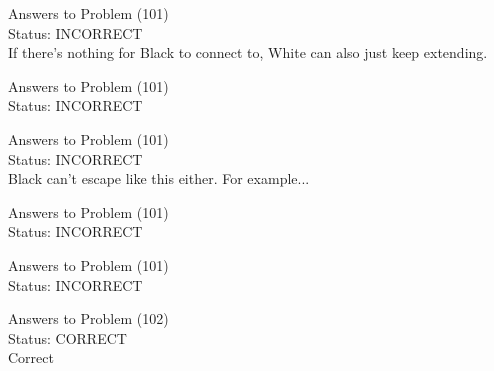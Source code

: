 \documentclass[11pt]{article}
\begin{document}
\begin{minipage}[t]{0.5\textwidth}
  {\centering
  
  Answers to Problem (101)\\
  Status: INCORRECT\\
  If there's nothing for Black to connect to, White can also just keep extending.\\
  }
\end{minipage}
\begin{minipage}[t]{0.5\textwidth}
  {\centering
  
  Answers to Problem (101)\\
  Status: INCORRECT\\
  
  }
\end{minipage}
\begin{minipage}[t]{0.5\textwidth}
  {\centering
  
  Answers to Problem (101)\\
  Status: INCORRECT\\
  Black can't escape like this either. For example...\\
  }
\end{minipage}
\begin{minipage}[t]{0.5\textwidth}
  {\centering
  
  Answers to Problem (101)\\
  Status: INCORRECT\\
  
  }
\end{minipage}
\begin{minipage}[t]{0.5\textwidth}
  {\centering
  
  Answers to Problem (101)\\
  Status: INCORRECT\\
  
  }
\end{minipage}
\begin{minipage}[t]{0.5\textwidth}
  {\centering
  
  Answers to Problem (102)\\
  Status: CORRECT\\
  Correct\\
  }
\end{minipage}
\end{document}
